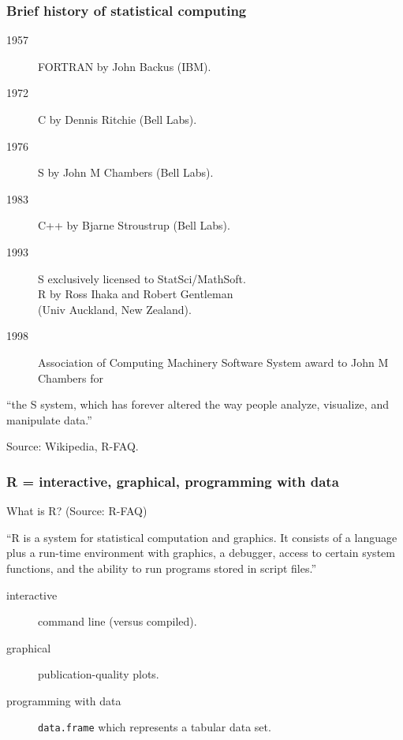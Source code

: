 \documentclass{beamer}
\begin{document}
\begin{frame}
  \frametitle{Brief history of statistical computing}
  \begin{description}
  \item[1957] FORTRAN by John Backus (IBM).
  \item[1972] C by Dennis Ritchie (Bell Labs).
  \item[1976] S by John M Chambers (Bell Labs).
  \item[1983] C++ by Bjarne Stroustrup (Bell Labs).
  \item[1993] S exclusively licensed to StatSci/MathSoft.\\
    R by Ross Ihaka and Robert Gentleman\\
    (Univ Auckland, New Zealand).
  \item[1998] Association of Computing Machinery 
    Software System award
    to John M Chambers for
  \end{description}
  ``the S system, which has forever altered the way people analyze,
  visualize, and manipulate data.''
  
  \vskip 0.5cm Source: Wikipedia, R-FAQ.
\end{frame}

\begin{frame}
  \frametitle{R = interactive, graphical, programming with data}
  
  What is R? (Source: R-FAQ)

  ``R is a system for statistical computation and graphics. It
  consists of a language plus a run-time environment with graphics, a
  debugger, access to certain system functions, and the ability to run
  programs stored in script files.'' 

  \begin{description}
  \item[interactive] command line (versus compiled).
  \item[graphical] publication-quality plots.
  \item[programming with data] \texttt{data.frame} which represents a
    tabular data set.
  \end{description}
\end{frame}
\end{document}
